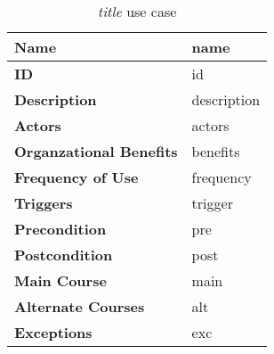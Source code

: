 \begin{table}
\begin{tabular}{|>{\raggedright\arraybackslash}p{3.2cm}|>{\raggedright\arraybackslash}p{10cm}|}
\hline
\textbf{Name}                   & name \\
\hline
\textbf{ID}                     & id \\
\hline
\textbf{Description}            & description \\
\hline
\textbf{Actors}                 & actors \\
\hline
\textbf{Organzational Benefits} & benefits \\
\hline
\textbf{Frequency of Use}       & frequency \\
\hline
\textbf{Triggers}               & trigger \\
\hline
\textbf{Precondition}           & pre \\
\hline
\textbf{Postcondition}          & post \\
\hline
\textbf{Main Course}            & main \\
\hline
\textbf{Alternate Courses}      & alt \\
\hline
\textbf{Exceptions}             & exc \\
\hline
\end{tabular}
\caption{\textit{title} use case}
\label{id}
\end{table}

